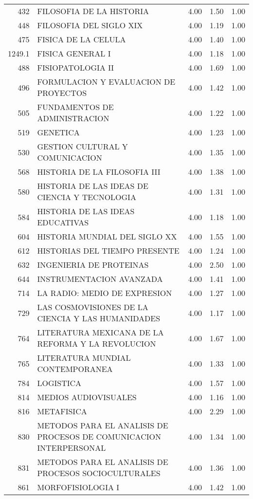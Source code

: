 \documentclass[12pt]{article}
\begin{document}
\begin{table}[ht]
\begin{tabular}{rlrrr}
  432 & FILOSOFIA DE LA HISTORIA & 4.00 & 1.50 & 1.00 \\ 
  448 & FILOSOFIA DEL SIGLO XIX & 4.00 & 1.19 & 1.00 \\ 
  475 & FISICA DE LA CELULA & 4.00 & 1.40 & 1.00 \\ 
  1249.1 & FISICA GENERAL I & 4.00 & 1.18 & 1.00 \\ 
  488 & FISIOPATOLOGIA II & 4.00 & 1.69 & 1.00 \\ 
  496 & FORMULACION Y EVALUACION DE PROYECTOS & 4.00 & 1.42 & 1.00 \\ 
  505 & FUNDAMENTOS DE ADMINISTRACION & 4.00 & 1.22 & 1.00 \\ 
  519 & GENETICA & 4.00 & 1.23 & 1.00 \\ 
  530 & GESTION CULTURAL Y COMUNICACION & 4.00 & 1.35 & 1.00 \\ 
  568 & HISTORIA DE LA FILOSOFIA III & 4.00 & 1.38 & 1.00 \\ 
  580 & HISTORIA DE LAS IDEAS DE CIENCIA Y TECNOLOGIA & 4.00 & 1.31 & 1.00 \\ 
  584 & HISTORIA DE LAS IDEAS EDUCATIVAS & 4.00 & 1.18 & 1.00 \\ 
  604 & HISTORIA MUNDIAL DEL SIGLO XX & 4.00 & 1.55 & 1.00 \\ 
  612 & HISTORIAS DEL TIEMPO PRESENTE & 4.00 & 1.24 & 1.00 \\ 
  632 & INGENIERIA DE PROTEINAS & 4.00 & 2.50 & 1.00 \\ 
  644 & INSTRUMENTACION AVANZADA & 4.00 & 1.41 & 1.00 \\ 
  714 & LA RADIO: MEDIO DE EXPRESION & 4.00 & 1.27 & 1.00 \\ 
  729 & LAS COSMOVISIONES DE LA CIENCIA Y LAS HUMANIDADES & 4.00 & 1.17 & 1.00 \\ 
  764 & LITERATURA MEXICANA DE LA REFORMA Y LA REVOLUCION & 4.00 & 1.67 & 1.00 \\ 
  765 & LITERATURA MUNDIAL CONTEMPORANEA & 4.00 & 1.33 & 1.00 \\ 
  784 & LOGISTICA & 4.00 & 1.57 & 1.00 \\ 
  814 & MEDIOS AUDIOVISUALES & 4.00 & 1.16 & 1.00 \\ 
  816 & METAFISICA & 4.00 & 2.29 & 1.00 \\ 
  830 & METODOS PARA EL ANALISIS DE PROCESOS DE COMUNICACION INTERPERSONAL & 4.00 & 1.34 & 1.00 \\ 
  831 & METODOS PARA EL ANALISIS DE PROCESOS SOCIOCULTURALES & 4.00 & 1.36 & 1.00 \\ 
  861 & MORFOFISIOLOGIA I & 4.00 & 1.42 & 1.00 \\ 

\end{tabular}
\end{table}
\end{document}
